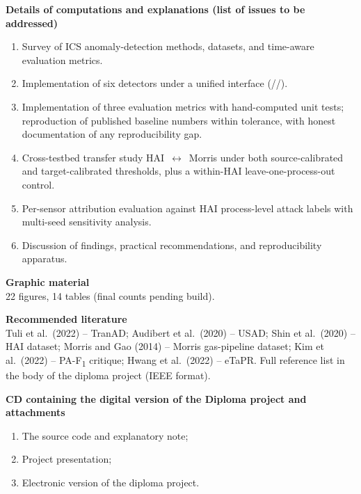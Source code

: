 \noindent\textbf{Details of computations and explanations (list of issues to be addressed)}
\begin{enumerate}
  \setlength\itemsep{0.1em}
  \item Survey of ICS anomaly-detection methods, datasets, and time-aware evaluation metrics.
  \item Implementation of six detectors under a unified  interface (//).
  \item Implementation of three evaluation metrics with hand-computed unit tests; reproduction of published baseline numbers within tolerance, with honest documentation of any reproducibility gap.
  \item Cross-testbed transfer study HAI~$\leftrightarrow$~Morris under both source-calibrated and target-calibrated thresholds, plus a within-HAI leave-one-process-out control.
  \item Per-sensor attribution evaluation against HAI process-level attack labels with multi-seed sensitivity analysis.
  \item Discussion of findings, practical recommendations, and reproducibility apparatus.
\end{enumerate}

\noindent\textbf{Graphic material}\\
22 figures, 14 tables (final counts pending build).

\vspace{0.3cm}

\noindent\textbf{Recommended literature}\\
Tuli et al.\ (2022) -- TranAD; Audibert et al.\ (2020) -- USAD; Shin et al.\ (2020) -- HAI dataset; Morris and Gao (2014) -- Morris gas-pipeline dataset; Kim et al.\ (2022) -- PA-F\textsubscript{1} critique; Hwang et al.\ (2022) -- eTaPR. Full reference list in the body of the diploma project (IEEE format).

\vspace{0.3cm}

\noindent\textbf{CD containing the digital version of the Diploma project and attachments}
\begin{enumerate}
  \setlength\itemsep{0.05em}
  \item The source code and explanatory note;
  \item Project presentation;
  \item Electronic version of the diploma project.
\end{enumerate}

